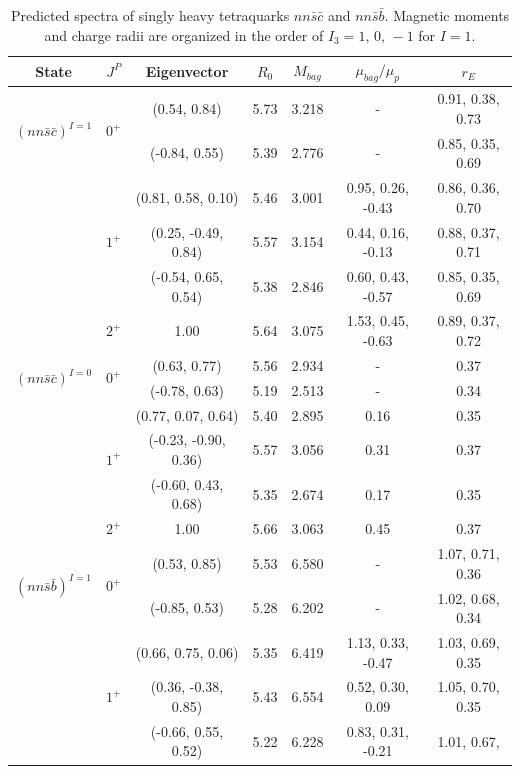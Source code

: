 \documentclass[prd,twocolumn,floatfix,nofootinbib]{revtex4}
\begin{document}
\renewcommand{\tabcolsep}{0.44cm} \renewcommand{\arraystretch}{1.3}
\begin{table}[!htb]
\caption{Predicted spectra of singly heavy tetraquarks $nn\bar{s}\bar{c}$
and $nn\bar{s}\bar{b}$. Magnetic moments and charge radii are organized in
the order of $I_{3}=1,\,0,\,-1$ for $I=1$.}
\label{tab:1heavytetraquark}%
\begin{tabular}{ccccccc}
\hline\hline
\textrm{State} & $J^{P}$ & \textrm{Eigenvector} & $R_{0}$ & $M_{bag}$ & $%
\mu_{bag}/\mu_{p}$ & $r_{E}$ \\ \hline
\multirow{2}{*}{${(nn\bar{s}\bar{c})}^{I=1}$} & \multirow{2}{*}{$0^{+}$} &
(0.54, 0.84) & 5.73 & 3.218 & - & 0.91, 0.38, 0.73 \\
&  & (-0.84, 0.55) & 5.39 & 2.776 & - & 0.85, 0.35, 0.69 \\
& \multirow{3}{*}{$1^{+}$} & (0.81, 0.58, 0.10) & 5.46 & 3.001 & 0.95, 0.26,
-0.43 & 0.86, 0.36, 0.70 \\
&  & (0.25, -0.49, 0.84) & 5.57 & 3.154 & 0.44, 0.16, -0.13 & 0.88, 0.37,
0.71 \\
&  & (-0.54, 0.65, 0.54) & 5.38 & 2.846 & 0.60, 0.43, -0.57 & 0.85, 0.35,
0.69 \\
& $2^{+}$ & 1.00 & 5.64 & 3.075 & 1.53, 0.45, -0.63 & 0.89, 0.37, 0.72 \\
\multirow{2}{*}{${(nn\bar{s}\bar{c})}^{I=0}$} & \multirow{2}{*}{$0^{+}$} &
(0.63, 0.77) & 5.56 & 2.934 & - & 0.37 \\
&  & (-0.78, 0.63) & 5.19 & 2.513 & - & 0.34 \\
& \multirow{3}{*}{$1^{+}$} & (0.77, 0.07, 0.64) & 5.40 & 2.895 & 0.16 & 0.35
\\
&  & (-0.23, -0.90, 0.36) & 5.57 & 3.056 & 0.31 & 0.37 \\
&  & (-0.60, 0.43, 0.68) & 5.35 & 2.674 & 0.17 & 0.35 \\
& $2^{+}$ & 1.00 & 5.66 & 3.063 & 0.45 & 0.37 \\
\multirow{2}{*}{${(nn\bar{s}\bar{b})}^{I=1}$} & \multirow{2}{*}{$0^{+}$} &
(0.53, 0.85) & 5.53 & 6.580 & - & 1.07, 0.71, 0.36 \\
&  & (-0.85, 0.53) & 5.28 & 6.202 & - & 1.02, 0.68, 0.34 \\
& \multirow{3}{*}{$1^{+}$} & (0.66, 0.75, 0.06) & 5.35 & 6.419 & 1.13, 0.33,
-0.47 & 1.03, 0.69, 0.35 \\
&  & (0.36, -0.38, 0.85) & 5.43 & 6.554 & 0.52, 0.30, 0.09 & 1.05, 0.70, 0.35
\\
&  & (-0.66, 0.55, 0.52) & 5.22 & 6.228 & 0.83, 0.31, -0.21 & 1.01, 0.67,

\end{tabular}
\end{table}
\end{document}
